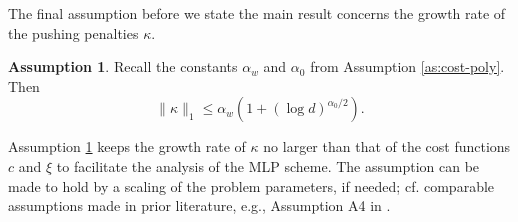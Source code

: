 \documentclass[11pt]{article}
\theoremstyle{definition}
\newtheorem{assumption}{Assumption}[section]
\theoremstyle{plain}
\begin{document}
The final assumption before we state the main result concerns the growth rate of the pushing penalties $\kappa$. 
\begin{assumption}\label{as:kappa}
Recall the constants $\alpha_w$ and $\alpha_0$ from Assumption \ref{as:cost-poly}. Then
\begin{equation}\label{eq:kappa}
\|\kappa\|_1 \leq \alpha_w \left(1+\left(\log d\right)^{\alpha_0/2}\right).
\end{equation}
\end{assumption}
Assumption \ref{as:kappa} keeps the growth rate of $\kappa$ no larger than that of the cost functions $c$ and $\xi$ 
to facilitate the analysis of the MLP scheme. The assumption can be made to hold by a scaling of the 
problem parameters, if needed; cf. comparable assumptions made in prior literature, e.g., Assumption A4 in \cite{BlanchetChenSiGlynn2021}.
\end{document}
